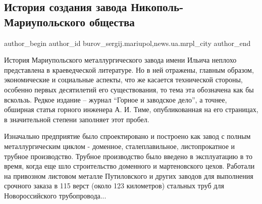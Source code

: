  
 
 
 
 
 
\subsection{История создания завода Никополь-Мариупольского общества}
\label{sec:19_01_2017.stz.news.ua.mrpl_city.1.istoria_sozdania_zavoda_nikopol_mariupol_obschestva}
 
\ifcmt
 author_begin
   author_id burov_sergij.mariupol,news.ua.mrpl_city
 author_end
\fi

История Мариупольского металлургического завода имени Ильича неплохо
представлена в краеведческой литературе. Но в ней отражены, главным образом,
экономические и социальные аспекты, что же касается технической стороны,
особенно первых десятилетий его существования, то тема эта обозначена как бы
вскользь. Редкое издание – журнал \enquote{Горное и заводское дело}, а точнее, обширная
статья горного инженера А. И. Тиме, опубликованная на его страницах, в
значительной степени заполняет этот пробел.


Изначально предприятие было спроектировано и построено как завод с полным
металлургическим циклом -  доменное, сталеплавильное, листопрокатное и трубное
производство. Трубное производство было введено в эксплуатацию в то время,
когда еще шло строительство доменного и мартеновского цехов. Работали на
привозном листовом металле Путиловского и других заводов для выполнения
срочного заказа в 115 верст (около 123 километров) стальных труб для
Новороссийского трубопровода...


